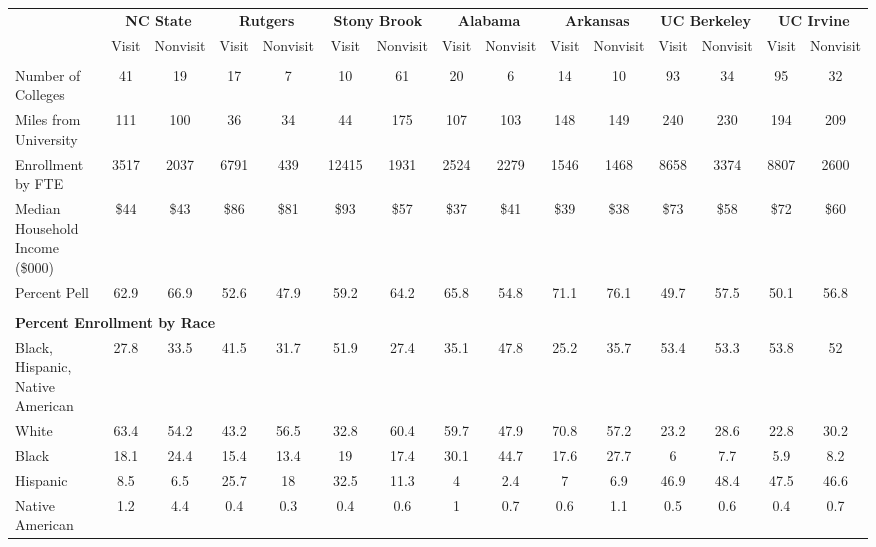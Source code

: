 \begin{tabular*}{\linewidth}{@{\extracolsep{\fill} } lcccccccccccccc}%
&\multicolumn{2}{c}{\bfseries NC State}&\multicolumn{2}{c}{\bfseries Rutgers}&\multicolumn{2}{c}{\bfseries Stony Brook}&\multicolumn{2}{c}{\bfseries Alabama}&\multicolumn{2}{c}{\bfseries Arkansas}&\multicolumn{2}{c}{\bfseries UC Berkeley}&\multicolumn{2}{c}{\bfseries UC Irvine}\\%
&Visit&\multicolumn{1}{l}{Nonvisit}&Visit&\multicolumn{1}{l}{Nonvisit}&Visit&\multicolumn{1}{l}{Nonvisit}&Visit&\multicolumn{1}{l}{Nonvisit}&Visit&\multicolumn{1}{l}{Nonvisit}&Visit&\multicolumn{1}{l}{Nonvisit}&Visit&\multicolumn{1}{l}{Nonvisit}\\%
\hline%
&&&&&&&&&&&&&&\\%
\hspace{0cm}Number of Colleges&41&19&17&7&10&61&20&6&14&10&93&34&95&32\\%
\hspace{0cm}Miles from University&111&100&36&34&44&175&107&103&148&149&240&230&194&209\\%
\hspace{0cm}Enrollment by FTE&3517&2037&6791&439&12415&1931&2524&2279&1546&1468&8658&3374&8807&2600\\%
\hspace{0cm}Median Household Income (\$000)&\$44&\$43&\$86&\$81&\$93&\$57&\$37&\$41&\$39&\$38&\$73&\$58&\$72&\$60\\%
\hspace{0cm}Percent Pell&62.9&66.9&52.6&47.9&59.2&64.2&65.8&54.8&71.1&76.1&49.7&57.5&50.1&56.8\\%
&&&&&&&&&&&&&&\\%
\multicolumn{15}{l}{\bfseries Percent Enrollment by Race}\\%
\hspace{0.2cm}Black, Hispanic, Native American&27.8&33.5&41.5&31.7&51.9&27.4&35.1&47.8&25.2&35.7&53.4&53.3&53.8&52\\%
\hspace{0.2cm}White&63.4&54.2&43.2&56.5&32.8&60.4&59.7&47.9&70.8&57.2&23.2&28.6&22.8&30.2\\%
\hspace{0.2cm}Black&18.1&24.4&15.4&13.4&19&17.4&30.1&44.7&17.6&27.7&6&7.7&5.9&8.2\\%
\hspace{0.2cm}Hispanic&8.5&6.5&25.7&18&32.5&11.3&4&2.4&7&6.9&46.9&48.4&47.5&46.6\\%
\hspace{0.2cm}Native American&1.2&4.4&0.4&0.3&0.4&0.6&1&0.7&0.6&1.1&0.5&0.6&0.4&0.7\\%

\end{tabular*}
